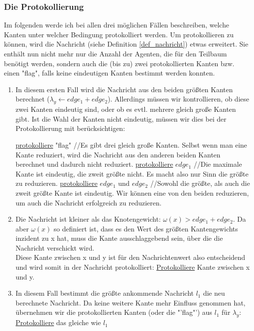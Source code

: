 \subsubsection{Die Protokollierung}

Im folgenden werde ich bei allen drei möglichen Fällen beschreiben, welche Kanten unter welcher Bedingung protokolliert werden. Um protokollieren zu können, wird die Nachricht (siehe Definition \ref{def_nachricht}) etwas erweitert. Sie enthält nun nicht mehr nur die Anzahl der Agenten, die für den Teilbaum benötigt werden, sondern auch die (bis zu) zwei protokollierten Kanten bzw. einen "flag", falls keine eindeutigen Kanten bestimmt werden konnten.

\begin{enumerate}[label=\alph*)]
	
	\item In diesem ersten Fall wird die Nachricht aus den beiden größten Kanten berechnet ($\lambda_{y} \gets edge_{1} + edge_{2}$). Allerdings müssen wir kontrollieren, ob diese zwei Kanten eindeutig sind, oder ob es evtl. mehrere gleich große Kanten gibt. Ist die Wahl der Kanten nicht eindeutig, müssen wir dies bei der Protokollierung mit berücksichtigen:\\
	
		\begin{algorithmic}
			\State \uline{protokolliere} "flag"
			\State//Es gibt drei gleich große Kanten. Selbst wenn man eine Kante reduziert, wird die Nachricht aus den anderen beiden Kanten berechnet und dadurch nicht reduziert.
			\State \uline{protokolliere} $edge_{1}$
			\State//Die maximale Kante ist eindeutig, die zweit größte nicht. Es macht also nur Sinn die größte zu reduzieren.
			\Else
			\State \uline{protokolliere} $edge_{1}$ und $edge_{2}$
			\State//Sowohl die größte, als auch die zweit größte Kante ist eindeutig. Wir können eine von den beiden reduzieren, um auch die Nachricht erfolgreich zu reduzieren.
			\EndIf
		\end{algorithmic}
	
	\item Die Nachricht ist kleiner als das Knotengewicht: $\omega(x) > edge_{1}+edge_{2}$. Da aber $\omega(x)$ so definiert ist, dass es den Wert des größten Kantengewichts inzident zu x hat, muss die Kante ausschlaggebend sein, über die die Nachricht verschickt wird. 
	\\
	Diese Kante zwischen x und y ist für den Nachrichtenwert also entscheidend und wird somit in der Nachricht protokolliert: \uline{Protokolliere} Kante zwischen x und y.
	
	\item In diesem Fall bestimmt die größte ankommende Nachricht $l_{1}$ die neu berechnete Nachricht. Da keine weitere Kante mehr Einfluss genommen hat, übernehmen wir die protokollierten Kanten (oder die "'flag"') aus $l_{1}$ für $\lambda_{y}$: \uline{Protokolliere} das gleiche wie $l_{1}$
	
\end{enumerate}
